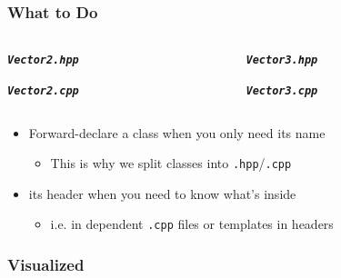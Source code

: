 \documentclass[glossy]{beamer}
\newcommand{\filename}[1]{\texttt{\textbf{\emph{#1}}}}
\begin{document}
\begin{frame}[fragile=singleslide]
  \frametitle{What to Do}
  
  \begin{columns}[t]
    \begin{column}{6cm}
      \filename{Vector2.hpp}
      
      \filename{Vector2.cpp}
    \end{column}

    \begin{column}{6cm}
      \filename{Vector3.hpp}
      
      \filename{Vector3.cpp}
    \end{column}
  \end{columns}
  
  \begin{itemize}
    \item Forward-declare a class when you only need its name
    \begin{itemize}
      \item This is why we split classes into \texttt{.hpp}/\texttt{.cpp}
    \end{itemize}
    \item {} its header when you need to know what's inside
    \begin{itemize}
      \item i.e. in dependent \texttt{.cpp} files or templates in headers
    \end{itemize}
  \end{itemize}
\end{frame}


\begin{frame}[fragile=singleslide]
  \frametitle{Visualized}

  \begin{figure}
    \centering
    \resizebox{0.9\columnwidth}{!}{}
  \end{figure}
\end{frame}

\end{document}
